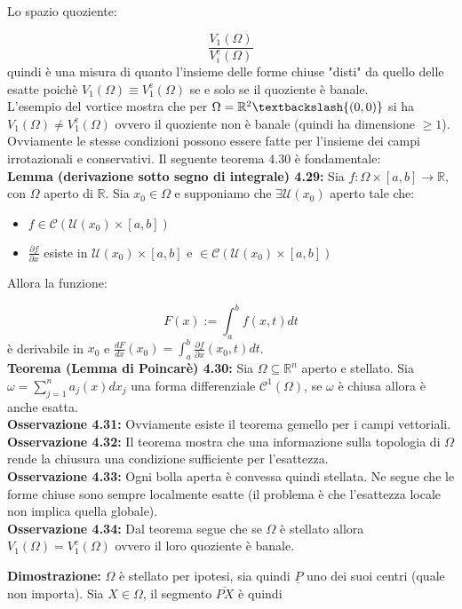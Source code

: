 \documentclass[a4paper,11pt,titlepage]{book}
\begin{document}
Lo spazio quoziente:

$$\frac{V_1(\Omega)}{{V_i^e(\Omega)}}$$
quindi è una misura di quanto l'insieme delle forme chiuse "disti" da quello delle esatte poichè $V_1(\Omega)\equiv V_1^e(\Omega)$ se e solo se il quoziente è banale.\\

 L'esempio del vortice mostra che per $\Omega=\mathbb{R}^2\textbackslash\{(0,0)\}$ si ha $V_1(\Omega)\neq V_1^e(\Omega)$ ovvero il quoziente non è banale (quindi ha dimensione $\geq1$). Ovviamente le stesse condizioni possono essere fatte per l'insieme dei campi irrotazionali e conservativi. Il seguente teorema 4.30 è fondamentale:\\
 
\textbf{Lemma (derivazione sotto segno di integrale) 4.29:} Sia $f:\Omega\times [a,b]\to\mathbb{R}$, con $\Omega$ aperto di $\mathbb{R}$. Sia $x_0\in\Omega$ e supponiamo che $\exists\mathcal{U}(x_0)$ aperto tale che:\begin{itemize}
\item $f\in\mathcal{C}(\mathcal{U}(x_0)\times[a,b])$
\item $\frac{\partial f}{\partial x}$ esiste in $\mathcal{U}(x_0)\times[a,b]$ e $\in\mathcal{C}(\mathcal{U}(x_0)\times[a,b])$
\end{itemize}
Allora la funzione:

$$F(x):=\int_a^b f(x,t)dt$$
è derivabile in $x_0$ e $\frac{dF}{dx}(x_0)=\int_a^b\frac{\partial f}{\partial x}(x_0,t)dt$.\\

\textbf{Teorema (Lemma di Poincarè) 4.30: } Sia $\Omega\subseteq\mathbb{R}^n$ aperto e stellato. Sia $\omega=\sum_{j=1}^n a_j(x)dx_j$ una forma differenziale $\mathcal{C}^1(\Omega)$, se $\omega$ è chiusa allora è anche esatta.\\

\textbf{Osservazione 4.31: }Ovviamente esiste il teorema gemello per i campi vettoriali.\\

\textbf{Osservazione 4.32: } Il teorema mostra che una informazione sulla topologia di $\Omega$ rende la chiusura una condizione sufficiente per l'esattezza.\\

\textbf{Osservazione 4.33: } Ogni bolla aperta è convessa quindi stellata. Ne segue che le forme chiuse sono sempre localmente esatte (il problema è che l'esattezza locale non implica quella globale).\\

\textbf{Osservazione 4.34: }Dal teorema segue che se $\Omega$ è stellato allora $V_1(\Omega)=V_1^e(\Omega)$ ovvero il loro quoziente è banale.

\textbf{Dimostrazione: }$\Omega$ è stellato per ipotesi, sia quindi $\underline{P}$ uno dei suoi centri (quale non importa). Sia $X\in\Omega$, il segmento $\overline{PX}$ è quindi
\end{document}

